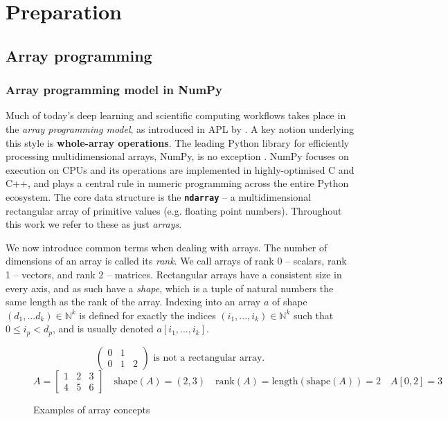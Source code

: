 \chapter{Preparation}

\section{Array programming}

\subsection{Array programming model in NumPy}

Much of today's deep learning and scientific computing workflows takes place in the \textit{array programming model}, as introduced in APL by \textcite{iverson1962programming}. A key notion underlying this style is \textbf{whole-array operations}. The leading Python library for efficiently processing multidimensional arrays, NumPy, is no exception \cite{harris2020array}. NumPy focuses on execution on CPUs and its operations are implemented in highly-optimised C and C++, and plays a central rule in numeric programming across the entire Python ecosystem. The core data structure is the \texttt{\textbf{ndarray}} -- a multidimensional rectangular array of primitive values (e.g. floating point numbers). Throughout this work we refer to these as just \textit{arrays}. 

We now introduce common terms when dealing with arrays. The number of dimensions of an array is called its \textit{rank}. We call arrays of rank 0  -- scalars, rank 1 -- vectors, and rank 2 -- matrices. Rectangular arrays have a consistent size in every axis, and as such have a \textit{shape}, which is a tuple of natural numbers the same length as the rank of the array. Indexing into an array $a$ of shape $(d_1, ... d_k) \in \mathbb{N}^k$ is defined for exactly the indices $(i_1, ..., i_k) \in \mathbb{N}^k$ such that $0 \le i_p < d_p$, and is usually denoted $a[i_1, ..., i_k]$.

\begin{figure}[h]
    \centering
    $$ \begin{pmatrix}
    0 & 1 & \\
    0 & 1 & 2
    \end{pmatrix} \text{ is not a rectangular array.} $$
    $$ A = \begin{bmatrix}
        1 & 2 & 3 \\ 
        4 & 5 & 6
    \end{bmatrix} \quad \mathrm{shape}(A) = (2, 3)  \quad \mathrm{rank}(A) = \mathrm{length}\left(\mathrm{shape}(A)\right) = 2 \quad A[0, 2] = 3 $$
    \caption{Examples of array concepts}
    \label{fig:array-examples}
\end{figure}

